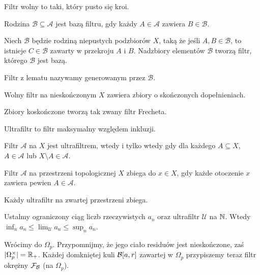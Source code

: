 \begin{definicja}
	Filtr wolny to taki, który pusto się kroi.
\end{definicja}

\begin{definicja}
	Rodzina $\mathcal B \subseteq \mathcal A$ jest bazą filtru, gdy każdy $A \in \mathcal A$ zawiera $B \in \mathcal B$.
\end{definicja}

\begin{lemat}
	Niech $\mathcal B$ będzie rodziną niepustych podzbiorów $X$, taką że jeśli $A, B \in \mathcal B$, to istnieje $C \in \mathcal B$ zawarty w przekroju $A$ i $B$.
	Nadzbiory elementów $\mathcal B$ tworzą filtr, którego $\mathcal B$ jest bazą.
\end{lemat}

Filtr z lematu nazywamy generowanym przez $\mathcal B$.

\begin{lemat}
	Wolny filtr na nieskończonym $X$ zawiera zbiory o skończonych dopełnieniach.
\end{lemat}

Zbiory koskończone tworzą tak zwany filtr Frecheta.

\begin{definicja}
	Ultrafiltr to filtr maksymalny względem inkluzji.
\end{definicja}

\begin{fakt}
	Filtr $\mathcal A$ na $X$ jest ultrafiltrem, wtedy i tylko wtedy gdy dla każdego $A \subseteq X$, $A \in \mathcal A$ lub $X \setminus A \in \mathcal A$.
\end{fakt}

\begin{definicja}
	Filtr $\mathcal A$ na przestrzeni topologicznej $X$ zbiega do $x \in X$, gdy każde otoczenie $x$ zawiera pewien $A \in \mathcal A$.
\end{definicja}

\begin{fakt}
	Każdy ultrafiltr na zwartej przestrzeni zbiega.
\end{fakt}

\begin{przyklad}
	Ustalmy ograniczony ciąg liczb rzeczywistych $a_n$ oraz ultrafiltr $\mathcal U$ na $\mathbb N$.
	Wtedy $\inf_n a_n \le \lim_{\mathcal U} a_n \le \sup_n a_n$.
\end{przyklad}

Wrócimy do $\Omega_p$.
Przypomnijmy, że jego ciało residuów jest nieskończone, zaś $|\Omega_p^\times| = \mathbb R_+$.
Każdej domkniętej kuli $\mathcal B[a, r]$ zawartej w $\Omega_p$ przypiszemy teraz filtr okrężny $\mathcal F_\mathcal B$ (na $\Omega_p$).

